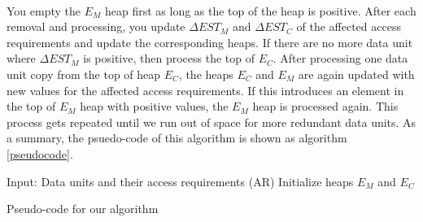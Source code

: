 \\
You empty the $E_M$ heap first as long as the top of the heap is positive. After each removal and processing, you update $\Delta EST_M$ and $\Delta EST_C$ of the affected access requirements and update the corresponding heaps. If there are no more data unit where $\Delta EST_M$ is positive, then process the top of $E_C$. After processing one data unit copy from the top of heap $E_C$, the heaps $E_C$ and $E_M$ are again updated with new values for the affected access requirements. If this introduces an element in the top of $E_M$ heap with positive values, the $E_M$ heap is processed again. This process gets repeated until we run out of space for more redundant data units. As a summary, the psuedo-code of this algorithm is shown as algorithm \ref{pseudocode}.

\begin{algorithm}
Input: Data units and their access requirements (AR) \;
Initialize heaps $E_M$ and $E_C$ \;
\caption{Pseudo-code for our algorithm}
\label{pseudocode}
\end{algorithm}

